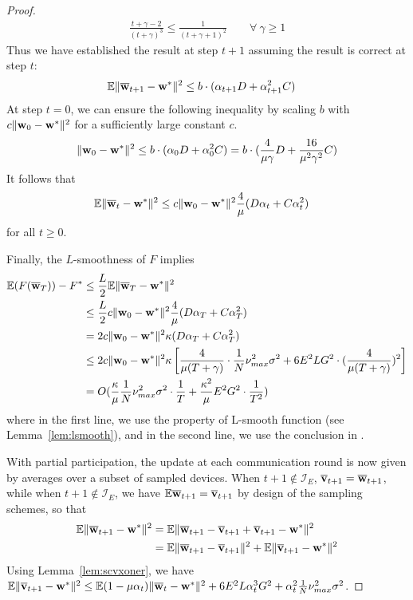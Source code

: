 \begin{proof}
\begin{align*}
	\frac{t+\gamma-2}{(t+\gamma)^{3}} \leq\frac{1}{(t+\gamma+1)^{2}}  \hspace{2em}  \forall\ \gamma\geq1
	\end{align*}
	Thus we have established the result at step $t+1$ assuming the result is correct at step $t$:
	\begin{align*}
	\mathbb{E}\|{\overline{\mathbf{w}}}_{t+1}-{\mathbf{w}}^{\ast}\|^{2} & \leq b\cdot(\alpha_{t+1}D+\alpha_{t+1}^{2}C)
	\end{align*}
	At step $t=0$, we can ensure the following inequality by scaling $b$ with $c\|{\mathbf{w}}_{0}-{\mathbf{w}}^{\ast}\|^{2}$ for a sufficiently large constant
	$c$.
	\begin{align*}
	\|{\mathbf{w}}_{0}-{\mathbf{w}}^{\ast}\|^{2} \leq b\cdot(\alpha_{0}D+\alpha_{0}^{2}C) =b\cdot(\frac{4}{\mu\gamma}D+\frac{16}{\mu^{2}\gamma^{2}}C)
	\end{align*}
	It follows that 
	\begin{align}
	\mathbb{E}\|{\overline{\mathbf{w}}}_{t}-{\mathbf{w}}^{\ast}\|^{2} & \leq c\|{\mathbf{w}}_{0}-{\mathbf{w}}^{\ast}\|^{2}\frac{4}{\mu}(D\alpha_{t}+C\alpha_{t}^{2})
	\label{eq:th1:1}
	\end{align}
	for all $t\geq0$. 
	
	Finally, the $L$-smoothness of $F$ implies 
	\begin{align*}
	\mathbb{E}(F({\overline{\mathbf{w}}}_{T}))-F^{\ast} & \leq\frac{L}{2}\mathbb{E}\|{\overline{\mathbf{w}}}_{T}-{\mathbf{w}}^{\ast}\|^{2}\\ 
	& \leq\frac{L}{2}c\|{\mathbf{w}}_{0}-{\mathbf{w}}^{\ast}\|^{2}\frac{4}{\mu}(D\alpha_{T}+C\alpha_{T}^{2})\\
	& =2c\|{\mathbf{w}}_{0}-{\mathbf{w}}^{\ast}\|^{2}\kappa(D\alpha_{T}+C\alpha_{T}^{2})\\
	& \leq2c\|{\mathbf{w}}_{0}-{\mathbf{w}}^{\ast}\|^{2}\kappa\left[\frac{4}{\mu(T+\gamma)}\cdot\frac{1}{N}\nu_{max}^{2}\sigma^{2}+6E^{2}LG^{2}\cdot(\frac{4}{\mu(T+\gamma)})^{2}\right]\\
	& =O(\frac{\kappa}{\mu}\frac{1}{N}\nu_{max}^{2}\sigma^{2}\cdot\frac{1}{T}+\frac{\kappa^{2}}{\mu}E^{2}G^{2}\cdot\frac{1}{T^{2}})
	\end{align*}
	where in the first line, we use the property of L-smooth function (see Lemma~\ref{lem:lsmooth}), and in the second line, we use the conclusion in \eq{\ref{eq:th1:1}}. 
	
	With partial participation, the update at each communication round
	is now given by averages over a subset of sampled devices. When $t+1\notin\mathcal{I}_{E}$,
	${\overline{\mathbf{v}}}_{t+1}={\overline{\mathbf{w}}}_{t+1}$, while when $t+1\notin\mathcal{I}_{E}$,
	we have $\mathbb{E}{\overline{\mathbf{w}}}_{t+1}={\overline{\mathbf{v}}}_{t+1}$ by design
	of the sampling schemes, so that 
	\begin{align*}
	\mathbb{E}\|{\overline{\mathbf{w}}}_{t+1}-{\mathbf{w}}^{\ast}\|^{2} & =\mathbb{E}\|{\overline{\mathbf{w}}}_{t+1}-{\overline{\mathbf{v}}}_{t+1}+{\overline{\mathbf{v}}}_{t+1}-{\mathbf{w}}^{\ast}\|^{2}\\
	& =\mathbb{E}\|{\overline{\mathbf{w}}}_{t+1}-{\overline{\mathbf{v}}}_{t+1}\|^{2}+\mathbb{E}\|{\overline{\mathbf{v}}}_{t+1}-{\mathbf{w}}^{\ast}\|^{2}
	\end{align*}
	Using Lemma~\ref{lem:scvxoner}, we have $\mathbb{E}\|{\overline{\mathbf{v}}}_{t+1}-{\mathbf{w}}^{\ast}\|^{2}\leq\mathbb{E}(1-\mu\alpha_{t})\|{\overline{\mathbf{w}}}_{t}-{\mathbf{w}}^{\ast}\|^{2}+6E^{2}L\alpha_{t}^{3}G^{2}+\alpha_{t}^{2}\frac{1}{N}\nu_{max}^{2}\sigma^{2}$. 
	

\end{proof}
